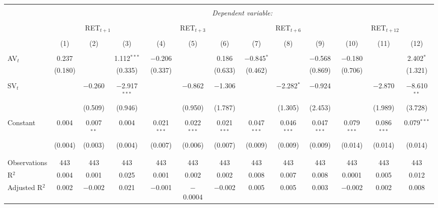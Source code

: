 
\begin{table}[!htbp] \centering 
  \caption{} 
  \label{} 
\begin{tabular}{@{\extracolsep{5pt}}lcccccccccccc} 
\\[-1.8ex]\hline 
\hline \\[-1.8ex] 
 & \multicolumn{12}{c}{\textit{Dependent variable:}} \\ 
\cline{2-13} 
\\[-1.8ex] & \multicolumn{3}{c}{RET$_{t+1}$} & \multicolumn{3}{c}{RET$_{t+3}$} & \multicolumn{3}{c}{RET$_{t+6}$} & \multicolumn{3}{c}{RET$_{t+12}$} \\ 
\\[-1.8ex] & (1) & (2) & (3) & (4) & (5) & (6) & (7) & (8) & (9) & (10) & (11) & (12)\\ 
\hline \\[-1.8ex] 
 AV$_{t}$ & 0.237 &  & 1.112$^{***}$ & $-$0.206 &  & 0.186 & $-$0.845$^{*}$ &  & $-$0.568 & $-$0.180 &  & 2.402$^{*}$ \\ 
  & (0.180) &  & (0.335) & (0.337) &  & (0.633) & (0.462) &  & (0.869) & (0.706) &  & (1.321) \\ 
  & & & & & & & & & & & & \\ 
 SV$_{t}$ &  & $-$0.260 & $-$2.917$^{***}$ &  & $-$0.862 & $-$1.306 &  & $-$2.282$^{*}$ & $-$0.924 &  & $-$2.870 & $-$8.610$^{**}$ \\ 
  &  & (0.509) & (0.946) &  & (0.950) & (1.787) &  & (1.305) & (2.453) &  & (1.989) & (3.728) \\ 
  & & & & & & & & & & & & \\ 
 Constant & 0.004 & 0.007$^{**}$ & 0.004 & 0.021$^{***}$ & 0.022$^{***}$ & 0.021$^{***}$ & 0.047$^{***}$ & 0.046$^{***}$ & 0.047$^{***}$ & 0.079$^{***}$ & 0.086$^{***}$ & 0.079$^{***}$ \\ 
  & (0.004) & (0.003) & (0.004) & (0.007) & (0.006) & (0.007) & (0.009) & (0.009) & (0.009) & (0.014) & (0.014) & (0.014) \\ 
  & & & & & & & & & & & & \\ 
\hline \\[-1.8ex] 
Observations & 443 & 443 & 443 & 443 & 443 & 443 & 443 & 443 & 443 & 443 & 443 & 443 \\ 
R$^{2}$ & 0.004 & 0.001 & 0.025 & 0.001 & 0.002 & 0.002 & 0.008 & 0.007 & 0.008 & 0.0001 & 0.005 & 0.012 \\ 
Adjusted R$^{2}$ & 0.002 & $-$0.002 & 0.021 & $-$0.001 & $-$0.0004 & $-$0.002 & 0.005 & 0.005 & 0.003 & $-$0.002 & 0.002 & 0.008 \\ 

\end{tabular}
\end{table}
